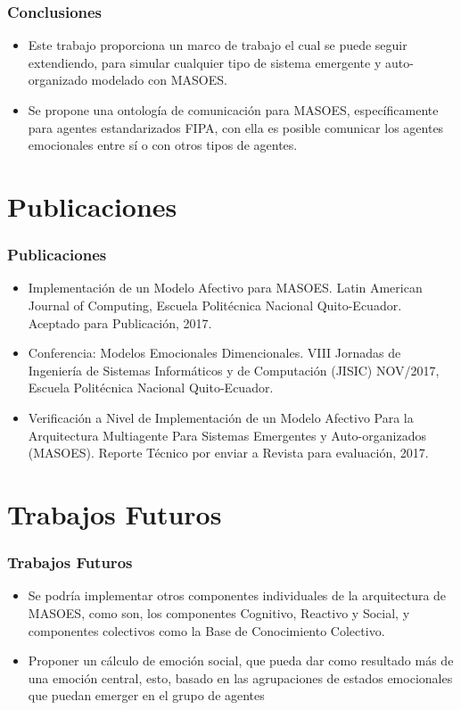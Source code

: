 \documentclass{beamer}
\begin{document}
\begin{frame}
\frametitle{Conclusiones}
\begin{itemize}
  \item Este trabajo proporciona un marco de trabajo el cual se puede seguir extendiendo,
  para simular cualquier tipo de sistema emergente y auto-organizado modelado con MASOES.
  \item Se propone una ontología de
  comunicación para MASOES, específicamente para agentes estandarizados FIPA, con ella
  es posible comunicar los agentes emocionales entre sí o con otros tipos de agentes.
\end{itemize}
\end{frame}

\section{Publicaciones}
\begin{frame}
\frametitle{Publicaciones}
\begin{itemize}
\item Implementación de un Modelo Afectivo para MASOES. Latin American Journal of Computing, Escuela Politécnica Nacional
Quito-Ecuador. Aceptado para Publicación, 2017.
\item Conferencia: Modelos Emocionales Dimencionales. VIII Jornadas de Ingeniería de Sistemas Informáticos y de Computación (JISIC) NOV/2017, Escuela Politécnica Nacional
Quito-Ecuador.
\item Verificación a Nivel de Implementación de un Modelo Afectivo Para la Arquitectura Multiagente Para Sistemas Emergentes y Auto-organizados (MASOES). Reporte Técnico por enviar a Revista para evaluación, 2017.
\end{itemize}
\end{frame}

\section{Trabajos Futuros}
\begin{frame}
\frametitle{Trabajos Futuros}
\begin{itemize}
  \item Se podría implementar otros componentes individuales de la arquitectura de MASOES,
  como son, los componentes Cognitivo, Reactivo y Social, y componentes colectivos como
  la Base de Conocimiento Colectivo.
  \item Proponer un cálculo de emoción social,
  que pueda dar como resultado más de una emoción central, esto, basado en las agrupaciones de estados emocionales
  que puedan emerger en el grupo de agentes
\end{itemize}
\end{frame}


\ThankYouFrame
\end{document}
